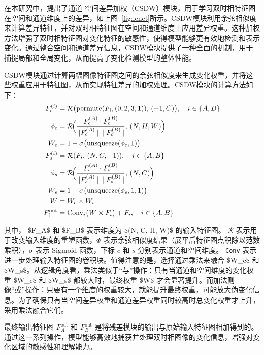 在本研究中，提出了通道-空间差异加权（CSDW）模块，用于学习双时相特征图在空间和通道维度上的差异，如上图~\ref{fig:lenet}所示。CSDW模块利用余弦相似度来计算差异特征，并对双时相特征图在空间和通道维度上应用差异权重。这种加权方法增强了双时相特征图对变化特征的敏感性，使得模型能够更有效地检测和表示变化。通过整合空间和通道差异信息，CSDW模块提供了一种全面的机制，用于捕捉局部和全局变化，从而提高了变化检测模型的整体性能。

CSDW模块通过计算两幅图像特征图之间的余弦相似度来生成变化权重，并将这些权重应用于特征图，从而实现特征差异的加权处理。CSDW模块的计算方法如下：
\begin{align}
F_c^{(i)} &= \mathcal{R}\bigl(\mathrm{permute}(F_i,(0,2,3,1)),\,(-1,C)\bigr), \quad i\in\{A,B\} \label{eq:lenet-1}\\
\phi_c &= \mathcal{R}\!\Bigl(\frac{F_c^{(A)}\cdot F_c^{(B)}}{\|F_c^{(A)}\|\;\|\;F_c^{(B)}\|},\,(N,H,W)\Bigr) \label{eq:lenet-2}\\
W_c &= 1 - \sigma\bigl(\mathrm{unsqueeze}(\phi_c,1)\bigr) \label{eq:lenet-3}\\
F_s^{(i)} &= \mathcal{R}(F_i,\,(N,C,-1)), \quad i\in\{A,B\} \label{eq:lenet-4}\\
\phi_s &= \mathcal{R}\!\Bigl(\frac{F_s^{(A)}\cdot F_s^{(B)}}{\|F_s^{(A)}\|\;\|\;F_s^{(B)}\|},\,(N,C)\Bigr) \label{eq:lenet-5}\\
W_s &= 1 - \sigma\bigl(\mathrm{unsqueeze}(\phi_s,1,1)\bigr) \label{eq:lenet-6}\\
W &= W_c \times W_s \label{eq:lenet-7}\\
F_i^{\mathrm{out}} &= \mathrm{Conv}_i\bigl(W \times F_i\bigr) + F_i,\quad i\in\{A,B\} \label{eq:lenet-8}
\end{align}

其中， \$F\_{A}\$ 和 \$F\_{B}\$ 表示维度为 \$(N, C, H, W)\$ 的输入特征图。
\(\mathcal{R}\) 表示用于改变输入维度的重塑函数，\(\Phi\) 表示余弦相似度结果（展平后特征图点积除以范数乘积），\(\sigma\) 表示 Sigmoid 函数，下标 \(c\) 和 \(s\) 分别表示通道和空间维度。
\texttt{Conv} 表示进一步处理输入特征图的卷积块。值得注意的是，选择通过乘法来融合 \$W\_{c}\$ 和 \$W\_{s}\$。从逻辑角度看，乘法类似于“与”操作：只有当通道和空间维度的变化权重 \$W\_{c}\$ 和 \$W\_{s}\$ 都较大时，最终权重 \$W\$ 才会显著提升。而加法则像“或”操作：只要有一个维度的权重较大，就能提升最终权重，可能放大伪变化信息。为了确保只有当空间差异权重和通道差异权重同时较高时总变化权重才上升，采用乘法融合它们。

最终输出特征图 \(F_{A}^{\mathrm{out}}\) 和 \(F_{B}^{\mathrm{out}}\) 是将残差模块的输出与原始输入特征图相加得到的。通过这一系列操作，模型能够高效地捕获并处理双时相图像的变化信息，增强对变化区域的敏感性和理解能力。

